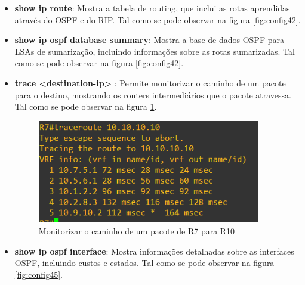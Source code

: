 \documentclass[11pt,english, openright, oneside]{book}
\begin{document}
\begin{itemize}
  \item \textbf{show ip route}: Mostra a tabela de routing, que inclui as rotas aprendidas através do OSPF e do RIP. Tal como se pode observar na figura \ref{fig:config42}.
  \vspace{0.2cm}

  \item \textbf{show ip ospf database summary}: Mostra a base de dados OSPF para LSAs de sumarização, incluindo informações sobre as rotas sumarizadas. Tal como se pode observar na figura \ref{fig:config42}.
  \vspace{0.2cm}

  \item \textbf{trace <destination-ip> }: Permite monitorizar o caminho de um pacote para o destino, mostrando os routers intermediários que o pacote atravessa. Tal como se pode observar na figura \ref{fig:config44}.
  \vspace{0.2cm}

  \begin{figure}[H]
    \centering
    \includegraphics[width=0.92\textwidth]{imagens/Tarefa5/25.trace_R7_R10.png}
    \caption{Monitorizar o caminho de um pacote de R7 para R10}
    \label{fig:config44}
  \end{figure}

  \item \textbf{show ip ospf interface}: Mostra informações detalhadas sobre as interfaces OSPF, incluindo custos e estados. Tal como se pode observar na figura \ref{fig:config45}.
  \vspace{0.2cm}


\end{itemize}
\end{document}
